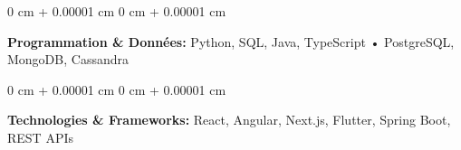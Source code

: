 \documentclass[10pt, letterpaper]{article}
\newenvironment{onecolentry}{
    \begin{adjustwidth}{
        0 cm + 0.00001 cm
    }{
        0 cm + 0.00001 cm
    }
}{
    \end{adjustwidth}
} %
\begin{document}
        
        \begin{onecolentry}
            \textbf{Programmation \& Données:} Python, SQL, Java, TypeScript • PostgreSQL, MongoDB, Cassandra
        \end{onecolentry}

        \vspace{0.2 cm}

        \begin{onecolentry}
            \textbf{Technologies \& Frameworks:} React, Angular, Next.js, Flutter, Spring Boot, REST APIs
        \end{onecolentry}


    
\end{document}
